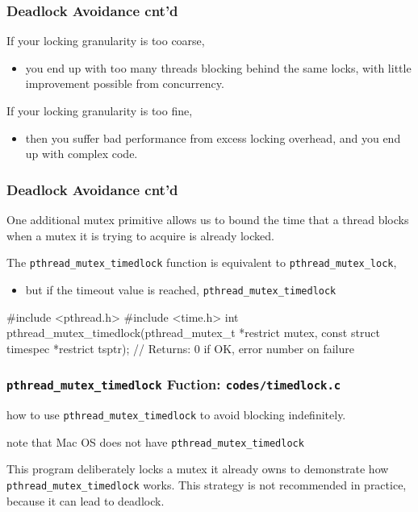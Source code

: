 \documentclass[newPxFont,sthlmFooter,nooffset]{beamer}
\begin{document}
\begin{frame}[t]
  \frametitle{Deadlock Avoidance cnt'd}
If your locking granularity is too coarse,
\begin{itemize}
\item you end up with too many threads blocking behind the same locks,
  with little improvement possible from concurrency.
\end{itemize}
If your locking granularity is too fine,
\begin{itemize}
\item then you suffer bad performance from excess locking overhead,
  and you end up with complex code.
\end{itemize}

\end{frame}

\begin{frame}[fragile, t]
  \frametitle{Deadlock Avoidance cnt'd}
One additional mutex primitive allows us to bound the time that a thread blocks when a mutex it is trying to acquire is already locked. 

The \texttt{pthread\_mutex\_timedlock} function is equivalent to \texttt{pthread\_mutex\_lock},
\begin{itemize}
\item but if the timeout value is reached, \texttt{pthread\_mutex\_timedlock}
\end{itemize}

\begin{codedef}
#include <pthread.h>
#include <time.h>
int pthread_mutex_timedlock(pthread_mutex_t *restrict mutex, 
                           const struct timespec *restrict tsptr);
// Returns: 0 if OK, error number on failure
\end{codedef}
\end{frame}

\begin{frame}
  \frametitle{\texttt{pthread\_mutex\_timedlock} Fuction: \texttt{codes/timedlock.c}}
how to use \texttt{pthread\_mutex\_timedlock} to avoid blocking indefinitely.

note that Mac OS does not have \texttt{pthread\_mutex\_timedlock}
  

This program deliberately locks a mutex it already owns to demonstrate how \texttt{pthread\_mutex\_timedlock} works. This strategy is not recommended in practice, because it can lead to deadlock.
\end{frame}
\end{document}
